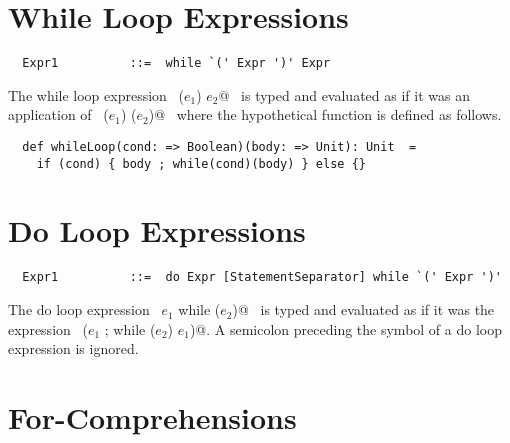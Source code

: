 \section{While Loop Expressions}

\syntax\begin{lstlisting}
  Expr1          ::=  while `(' Expr ')' Expr
\end{lstlisting}

The while loop expression ~\lstinline@while ($e_1$) $e_2$@~ is typed and
evaluated as if it was an application of ~\lstinline@whileLoop ($e_1$) ($e_2$)@~ where
the hypothetical function  is defined as follows.

\begin{lstlisting}
  def whileLoop(cond: => Boolean)(body: => Unit): Unit  =
    if (cond) { body ; while(cond)(body) } else {}
\end{lstlisting}


\section{Do Loop Expressions}

\syntax\begin{lstlisting}
  Expr1          ::=  do Expr [StatementSeparator] while `(' Expr ')'
\end{lstlisting}

The do loop expression ~\lstinline@do $e_1$ while ($e_2$)@~ is typed and
evaluated as if it was the expression ~\lstinline@($e_1$ ; while ($e_2$) $e_1$)@.
A semicolon preceding the  symbol of a do loop expression is ignored.

\section{For-Comprehensions}\label{sec:for-comprehensions}

